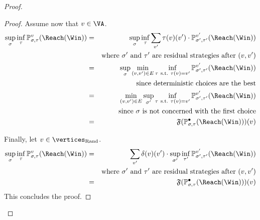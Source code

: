 \begin{proof}
\begin{proof}
    Assume now that $v \in \VA$. 
    \begin{eqnarray*}
      \sup_\sigma \inf_\tau \probm_{\sigma,\tau}^v(\Reach(\Win)) & = &
      \sup_\sigma \inf_\tau \sum_{v'} \tau(v)(v')
      \cdot \probm_{\sigma',\tau'}^{v'}(\Reach(\Win)) \\
      & & \text{where}\ \sigma'\ \text{and}\ \tau'\ \text{are residual
        strategies after}\ (v,v') \\
      & = & \sup_\sigma \min_{(v,v') \in E} \inf_{\tau\
        \text{s.t.}\ \tau(v) = v'} 
       \probm_{\sigma',\tau'}^{v'}(\Reach(\Win)) \\
      & & \text{since deterministic choices are the best} \\
      & = & \min_{(v,v') \in E}  \sup_{\sigma'} \inf_{\tau\
        \text{s.t.}\ \tau(v) = v'} \probm_{\sigma',\tau'}^{v'}(\Reach(\Win)) \\
      & & \text{since}\ \sigma\ \text{is not concerned with the first
        choice} \\
      & = & \mathfrak{F}(\probm_{\sigma,\tau}^{\bullet}(\Reach(\Win)))(v)
    \end{eqnarray*}

    Finally, let  $v \in \Randomvertices$. 
    \begin{eqnarray*}
      \sup_\sigma \inf_\tau \probm_{\sigma,\tau}^v(\Reach(\Win)) & = & \sum_{v'} \delta(v)(v') \cdot \sup_{\sigma'} \inf_{\tau'} \probm_{\sigma',\tau'}^{v'}(\Reach(\Win))\\
            & & \text{where}\ \sigma'\ \text{and}\ \tau'\ \text{are residual
                strategies after}\ (v,v') \\
      & = & \mathfrak{F}(\probm_{\sigma,\tau}^{\bullet}(\Reach(\Win)))(v)
    \end{eqnarray*}
    This concludes the proof.
%
    

\end{proof}
\end{proof}
